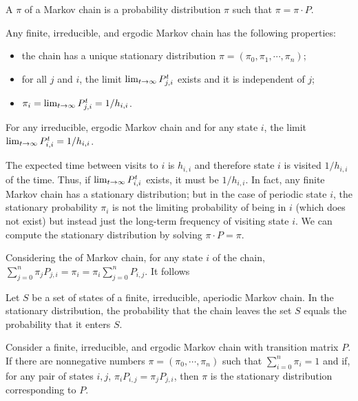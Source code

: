 \documentclass[main.tex]{subfiles}
\begin{document}
A  $\pi$ of a Markov chain is a probability distribution $\pi$ such that $\pi=\pi\cdot P$.

\begin{theorem}
    Any finite, irreducible, and ergodic Markov chain has the following properties:
    \begin{itemize}
        \item the chain has a unique stationary distribution $\pi=(\pi_0,\pi_1,\cdots,\pi_n)$;
        \item for all $j$ and $i$, the limit $\lim_{t\rightarrow\infty}P^t_{j,i}$ exists and it is independent of $j$;
        \item $\pi_i=\lim_{t\rightarrow\infty}P^t_{j,i}=1/h_{i,i}$.
    \end{itemize}
\end{theorem}

\begin{lemma}
    For any irreducible, ergodic Markov chain and for any state $i$, the limit $\lim_{t\rightarrow\infty}P^t_{i,i}=1/h_{i,i}$.
\end{lemma}

The expected time between visits to $i$ is $h_{i,i}$ and therefore state $i$ is visited $1/h_{i,i}$ of the time. Thus, if $\lim_{t\rightarrow\infty}P^t_{i,i}$ exists, it must be $1/h_{i,i}$. In fact, any finite Markov chain has a stationary distribution; but in the case of periodic state $i$, the stationary probability $\pi_i$ is not the limiting probability of being in $i$ (which does not exist) but instead just the long-term frequency of visiting state $i$. We can compute the stationary distribution by solving $\pi\cdot P = \pi$.

Considering the  of Markov chain, for any state $i$ of the chain, $\sum_{j=0}^{n}\pi_jP_{j,i}=\pi_i=\pi_i\sum_{j=0}^{n}P_{i,j}$. It follows

\begin{theorem}
    Let $S$ be a set of states of a finite, irreducible, aperiodic Markov chain. In the stationary distribution, the probability that the chain leaves the set $S$ equals the probability that it enters $S$.
\end{theorem}

\begin{theorem}
    Consider a finite, irreducible, and ergodic Markov chain with transition matrix $P$. If there are nonnegative numbers $\pi=(\pi_0,\cdots,\pi_n)$ such that $\sum_{i=0}^{n}\pi_i=1$ and if, for any pair of states $i,j$, $\pi_iP_{i,j}=\pi_jP_{j,i}$, then $\pi$ is the stationary distribution corresponding to $P$.
\end{theorem}
\end{document}
